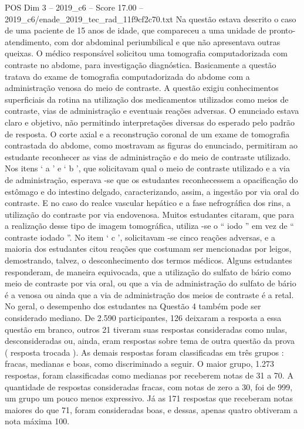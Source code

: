 \begin{textsample}{POS Dim 3 – 2019\_c6 – Score 17.00 – 2019\_c6/enade\_2019\_tec\_rad\_11f9cf2c70.txt}
Na questão estava descrito o caso de uma paciente de 15 anos de idade, que compareceu a uma unidade de pronto-atendimento, com dor abdominal periumbilical e que não apresentava outras queixas.
O médico responsável solicitou uma tomografia computadorizada com contraste no abdome, para investigação diagnóstica.
Basicamente a questão tratava do exame de tomografia computadorizada do abdome com a administração venosa do meio de contraste.
A questão exigiu conhecimentos superficiais da rotina na utilização dos medicamentos utilizados como meios de contraste, vias de administração e eventuais reações adversas.
O enunciado estava claro e objetivo, não permitindo interpretações diversas do esperado pelo padrão de resposta.
O corte axial e a reconstrução coronal de um exame de tomografia contrastada do abdome, como mostravam as figuras do enunciado, permitiram ao estudante reconhecer as vias de administração e do meio de contraste utilizado.
Nos itens ‘ a ’ e ‘ b ’, que solicitavam qual o meio de contraste utilizado e a via de administração, esperava -se que os estudantes reconhecessem a opacificação do estômago e do intestino delgado, caracterizando, assim, a ingestão por via oral do contraste.
E no caso do realce vascular hepático e a fase nefrográfica dos rins, a utilização do contraste por via endovenosa.
Muitos estudantes citaram, que para a realização desse tipo de imagem tomográfica, utiliza -se o “ iodo ” em vez de “ contraste iodado ”.
No item ‘ c ’, solicitavam -se cinco reações adversas, e a maioria dos estudantes citou reações que costumam ser mencionadas por leigos, demostrando, talvez, o desconhecimento dos termos médicos.
Alguns estudantes responderam, de maneira equivocada, que a utilização do sulfato de bário como meio de contraste por via oral, ou que a via de administração do sulfato de bário é a venosa ou ainda que a via de administração dos meios de contraste é a retal.
No geral, o desempenho dos estudantes na Questão 4 também pode ser considerado mediano.
De 2.590 participantes, 126 deixaram a resposta a essa questão em branco, outros 21 tiveram suas respostas consideradas como nulas, desconsideradas ou, ainda, eram respostas sobre tema de outra questão da prova ( resposta trocada ).
As demais respostas foram classificadas em três grupos : fracas, medianas e boas, como discriminado a seguir.
O maior grupo, 1.273 respostas, foram classificadas como medianas por receberem notas de 31 a 70.
A quantidade de respostas consideradas fracas, com notas de zero a 30, foi de 999, um grupo um pouco menos expressivo.
Já as 171 respostas que receberam notas maiores do que 71, foram consideradas boas, e dessas, apenas quatro obtiveram a nota máxima 100.

\end{textsample}
